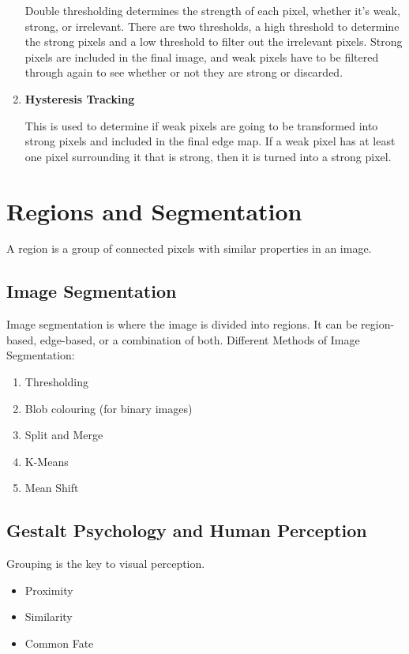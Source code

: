 \documentclass{article}
\begin{document}
\begin{multicols}{2}
\begin{enumerate}
        Double thresholding determines the strength of each pixel, whether it's weak, strong, or irrelevant.
        There are two thresholds, a high threshold to determine the strong pixels and a low threshold to filter out the irrelevant pixels.
        Strong pixels are included in the final image, and weak pixels have to be filtered through again to see whether or not they are strong or discarded.
        
        \item \textbf{Hysteresis Tracking}
        
        This is used to determine if weak pixels are going to be transformed into strong pixels and included in the final edge map.
        If a weak pixel has at least one pixel surrounding it that is strong, then it is turned into a strong pixel.
\end{enumerate}

\section{Regions and Segmentation}

A region is a group of connected pixels with similar properties in an image.
\subsection{Image Segmentation}

Image segmentation is where the image is divided into regions. It can be region-based, edge-based, or a combination of both.
Different Methods of Image Segmentation:
\begin{enumerate}
  \item {Thresholding}
  \item {Blob colouring (for binary images)}
  \item {Split and Merge}
  \item {K-Means}
  \item {Mean Shift}
\end{enumerate}

\subsection{Gestalt Psychology and Human Perception}

Grouping is the key to visual perception. 

\begin{itemize}
  \item {Proximity}
  \item {Similarity}
  \item {Common Fate}
  

\end{itemize}
\end{multicols}
\end{document}
